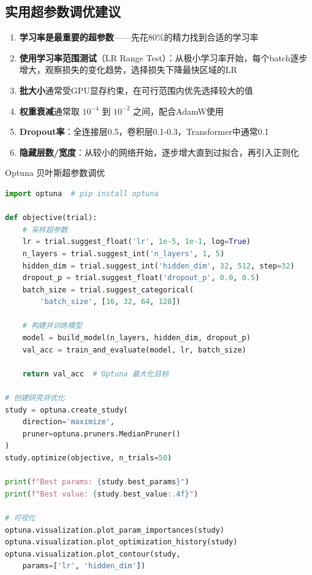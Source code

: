 \subsection{实用超参数调优建议}

\begin{enumerate}
    \item \textbf{学习率是最重要的超参数}——先花80\%的精力找到合适的学习率
    \item \textbf{使用学习率范围测试}（LR Range Test）：从极小学习率开始，每个batch逐步增大，观察损失的变化趋势，选择损失下降最快区域的LR
    \item \textbf{批大小}通常受GPU显存约束，在可行范围内优先选择较大的值
    \item \textbf{权重衰减}通常取 $10^{-4}$ 到 $10^{-2}$ 之间，配合AdamW使用
    \item \textbf{Dropout率}：全连接层0.5，卷积层0.1-0.3，Transformer中通常0.1
    \item \textbf{隐藏层数/宽度}：从较小的网络开始，逐步增大直到过拟合，再引入正则化
\end{enumerate}

\begin{mycode}{Optuna 贝叶斯超参数调优}
\begin{lstlisting}[language=Python]
import optuna  # pip install optuna

def objective(trial):
    # 采样超参数
    lr = trial.suggest_float('lr', 1e-5, 1e-1, log=True)
    n_layers = trial.suggest_int('n_layers', 1, 5)
    hidden_dim = trial.suggest_int('hidden_dim', 32, 512, step=32)
    dropout_p = trial.suggest_float('dropout_p', 0.0, 0.5)
    batch_size = trial.suggest_categorical(
        'batch_size', [16, 32, 64, 128])

    # 构建并训练模型
    model = build_model(n_layers, hidden_dim, dropout_p)
    val_acc = train_and_evaluate(model, lr, batch_size)

    return val_acc  # Optuna 最大化目标

# 创建研究并优化
study = optuna.create_study(
    direction='maximize',
    pruner=optuna.pruners.MedianPruner()
)
study.optimize(objective, n_trials=50)

print(f"Best params: {study.best_params}")
print(f"Best value: {study.best_value:.4f}")

# 可视化
optuna.visualization.plot_param_importances(study)
optuna.visualization.plot_optimization_history(study)
optuna.visualization.plot_contour(study,
    params=['lr', 'hidden_dim'])
\end{lstlisting}
\end{mycode}

